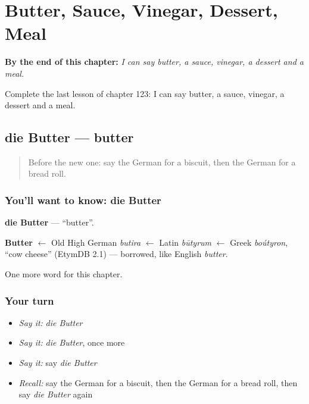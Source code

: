 
\chapter{Butter, Sauce, Vinegar, Dessert, Meal}
\label{ch:ge-butter-sauce-vinegar-dessert-meal}

\begin{chapteropening}
\textbf{By the end of this chapter:} \emph{I can say butter, a sauce, vinegar, a dessert and a meal.}

Complete the last lesson of chapter 123: I can say butter, a sauce, vinegar, a dessert and a meal.
\end{chapteropening}

\section[die Butter]{die Butter — butter}

\label{lesson:GE-C123-butter}



\begin{quote}
Before the new one: say the German for a biscuit, then the German for a bread roll.
\end{quote}

\subsection*{You'll want to know: die Butter}
\textbf{die Butter} — \textquotedblleft{}butter\textquotedblright{}.

\begin{cousinweb}
\textbf{Butter} $\leftarrow$ Old High German \emph{butira} $\leftarrow$ Latin \emph{būtyrum} $\leftarrow$ Greek \emph{boútyron}, \textquotedblleft{}cow cheese\textquotedblright{} (EtymDB 2.1) — borrowed, like English \emph{butter}.
\end{cousinweb}

\begin{grammarlens}[title={What you've built}]
One more word for this chapter.
\end{grammarlens}

\subsection*{Your turn}
\begin{itemize}
\raggedright
  \item \emph{Say it:} \emph{die Butter}
  \item \emph{Say it:} \emph{die Butter}, once more
  \item \emph{Say it:} say \emph{die Butter}
  \item \emph{Recall:} say the German for a biscuit, then the German for a bread roll, then say \emph{die Butter} again
\end{itemize}

